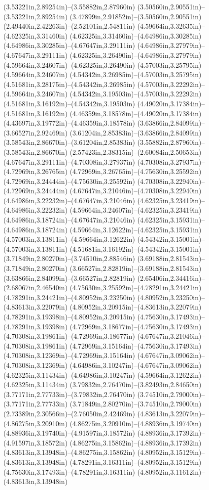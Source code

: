 (3.53221in,2.89254in)--(3.55882in,2.87960in) (3.50560in,2.90551in)--(3.53221in,2.89254in) (3.47899in,2.91852in)--(3.50560in,2.90551in) (2.49440in,2.42263in)--(2.52101in,2.54811in) (4.59664in,3.32635in)--(4.62325in,3.31460in) (4.62325in,3.31460in)--(4.64986in,3.30285in) (4.64986in,3.30285in)--(4.67647in,3.29111in) (4.64986in,3.27979in)--(4.67647in,3.29111in) (4.62325in,3.26490in)--(4.64986in,3.27979in) (4.59664in,3.24607in)--(4.62325in,3.26490in) (4.57003in,3.25795in)--(4.59664in,3.24607in) (4.54342in,3.26985in)--(4.57003in,3.25795in) (4.51681in,3.28175in)--(4.54342in,3.26985in) (4.57003in,3.22292in)--(4.59664in,3.24607in) (4.54342in,3.19503in)--(4.57003in,3.22292in) (4.51681in,3.16192in)--(4.54342in,3.19503in) (4.49020in,3.17384in)--(4.51681in,3.16192in) (4.46359in,3.18578in)--(4.49020in,3.17384in) (4.43697in,3.19772in)--(4.46359in,3.18578in) (3.63866in,2.84099in)--(3.66527in,2.92469in) (3.61204in,2.85383in)--(3.63866in,2.84099in) (3.58543in,2.86670in)--(3.61204in,2.85383in) (3.55882in,2.87960in)--(3.58543in,2.86670in) (2.57423in,2.38315in)--(2.60084in,2.50653in) (4.67647in,3.29111in)--(4.70308in,3.27937in) (4.70308in,3.27937in)--(4.72969in,3.26765in) (4.72969in,3.26765in)--(4.75630in,3.25592in) (4.72969in,3.24444in)--(4.75630in,3.25592in) (4.70308in,3.22940in)--(4.72969in,3.24444in) (4.67647in,3.21046in)--(4.70308in,3.22940in) (4.64986in,3.22232in)--(4.67647in,3.21046in) (4.62325in,3.23419in)--(4.64986in,3.22232in) (4.59664in,3.24607in)--(4.62325in,3.23419in) (4.64986in,3.18724in)--(4.67647in,3.21046in) (4.62325in,3.15931in)--(4.64986in,3.18724in) (4.59664in,3.12622in)--(4.62325in,3.15931in) (4.57003in,3.13811in)--(4.59664in,3.12622in) (4.54342in,3.15001in)--(4.57003in,3.13811in) (4.51681in,3.16192in)--(4.54342in,3.15001in) (3.71849in,2.80270in)--(3.74510in,2.88546in) (3.69188in,2.81543in)--(3.71849in,2.80270in) (3.66527in,2.82819in)--(3.69188in,2.81543in) (3.63866in,2.84099in)--(3.66527in,2.82819in) (2.65406in,2.34416in)--(2.68067in,2.46540in) (4.75630in,3.25592in)--(4.78291in,3.24421in) (4.78291in,3.24421in)--(4.80952in,3.23250in) (4.80952in,3.23250in)--(4.83613in,3.22079in) (4.80952in,3.20915in)--(4.83613in,3.22079in) (4.78291in,3.19398in)--(4.80952in,3.20915in) (4.75630in,3.17493in)--(4.78291in,3.19398in) (4.72969in,3.18677in)--(4.75630in,3.17493in) (4.70308in,3.19861in)--(4.72969in,3.18677in) (4.67647in,3.21046in)--(4.70308in,3.19861in) (4.72969in,3.15164in)--(4.75630in,3.17493in) (4.70308in,3.12369in)--(4.72969in,3.15164in) (4.67647in,3.09062in)--(4.70308in,3.12369in) (4.64986in,3.10247in)--(4.67647in,3.09062in) (4.62325in,3.11434in)--(4.64986in,3.10247in) (4.59664in,3.12622in)--(4.62325in,3.11434in) (3.79832in,2.76470in)--(3.82493in,2.84650in) (3.77171in,2.77733in)--(3.79832in,2.76470in) (3.74510in,2.79000in)--(3.77171in,2.77733in) (3.71849in,2.80270in)--(3.74510in,2.79000in) (2.73389in,2.30566in)--(2.76050in,2.42469in) (4.83613in,3.22079in)--(4.86275in,3.20910in) (4.86275in,3.20910in)--(4.88936in,3.19740in) (4.88936in,3.19740in)--(4.91597in,3.18572in) (4.88936in,3.17392in)--(4.91597in,3.18572in) (4.86275in,3.15862in)--(4.88936in,3.17392in) (4.83613in,3.13948in)--(4.86275in,3.15862in) (4.80952in,3.15129in)--(4.83613in,3.13948in) (4.78291in,3.16311in)--(4.80952in,3.15129in) (4.75630in,3.17493in)--(4.78291in,3.16311in) (4.80952in,3.11612in)--(4.83613in,3.13948in) 